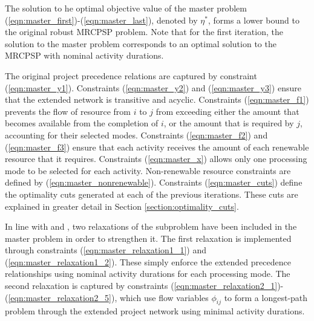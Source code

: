 \documentclass[a4paper,abstracton]{scrartcl}
\begin{document}

The solution to he optimal objective value of the master problem (\ref{eqn:master_first})-(\ref{eqn:master_last}), denoted by $\eta^*$, forms a lower bound to the original robust MRCPSP problem. Note that for the first iteration, the solution to the master problem corresponds to an optimal solution to the MRCPSP with nominal activity durations. 

The original project precedence relations are captured by constraint (\ref{eqn:master_y1}). Constraints (\ref{eqn:master_y2}) and (\ref{eqn:master_y3}) ensure that the extended network is transitive and acyclic. Constraints (\ref{eqn:master_f1}) prevents the flow of resource from $i$ to $j$ from exceeding either the amount that becomes available from the completion of $i$, or the amount that is required by $j$, accounting for their selected modes. Constraints (\ref{eqn:master_f2}) and (\ref{eqn:master_f3}) ensure that each activity receives the amount of each renewable resource that it requires. Constraints (\ref{eqn:master_x}) allows only one processing mode to be selected for each activity. Non-renewable resource constraints are defined by (\ref{eqn:master_nonrenewable}). Constraints (\ref{eqn:master_cuts}) define the optimality cuts generated at each of the previous iterations. These cuts are explained in greater detail in Section \ref{section:optimality_cuts}.

In line with \cite{bruni2017adjustable} and \cite{balouka2021robust}, two relaxations of the subproblem have been included in the master problem in order to strengthen it. The first relaxation is implemented through constraints (\ref{eqn:master_relaxation1_1}) and (\ref{eqn:master_relaxation1_2}). These simply enforce the extended precedence relationships using nominal activity durations for each processing mode. The second relaxation is captured by constraints (\ref{eqn:master_relaxation2_1})-(\ref{eqn:master_relaxation2_5}), which use flow variables $\phi_{ij}$ to form a longest-path problem through the extended project network using minimal activity durations.
\end{document}
